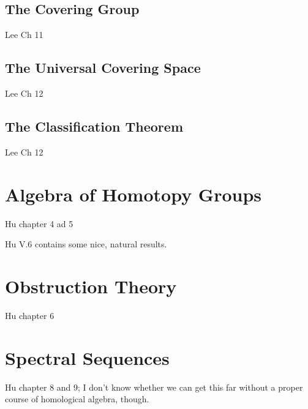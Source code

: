 \documentclass[oneside,english]{amsbook}
\numberwithin{section}{chapter}
\theoremstyle{plain}
\theoremstyle{definition}
\begin{document}
	\section{The Covering Group}
	
	Lee Ch 11
	
	\section{The Universal Covering Space}
	
	Lee Ch 12

	\section{The Classification Theorem}
	
	Lee Ch 12

	\chapter{Algebra of Homotopy Groups}	

	Hu chapter 4 ad 5
	
	Hu V.6 contains some nice, natural results.

	\chapter{Obstruction Theory}	

	Hu chapter 6

	\chapter{Spectral Sequences}	

	Hu chapter 8 and 9; I don't know whether we can get this far without a proper course of homological algebra, though.
\end{document}
